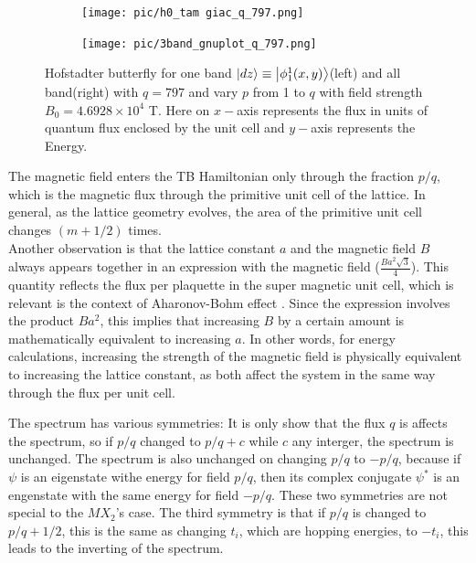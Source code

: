 \documentclass{report}
\begin{document}
\begin{figure}[htb]
	\centering
	\begin{subfigure}[b]{0.495\textwidth}
		\centering
		\texttt{[image: pic/h0\_tam giac\_q\_797.png]}
		\label{fig:3 band}
	\end{subfigure}
	\begin{subfigure}[b]{0.495\textwidth}
		\centering
		\texttt{[image: pic/3band\_gnuplot\_q\_797.png]}
		\label{fig:1 band}
	\end{subfigure}
	\caption{
		Hofstadter butterfly for one band $\ket{dz} \equiv \ket{\phi_{1}^{1}(x,y)}$(left) and all band(right) with $q = 797$ and vary $p$  from 1 to $q$ with field strength $B_{0} = 4.6928 \times 10^{4}$ T. Here on $x-$axis represents the flux in units of quantum flux enclosed by the unit cell and $y-$axis represents the Energy.
	}
\end{figure}

The magnetic field enters the TB Hamiltonian only through the fraction $p/q$, which is the magnetic flux through the primitive unit cell of the lattice. In general, as the lattice geometry evolves, the area of the primitive unit cell changes $(m + 1/2)$ times. \\
Another observation is that the lattice constant $a$ and the magnetic field $B$ always appears together in an expression with the magnetic field ($\tfrac{Ba^{2}\sqrt{3}}{4}$). This quantity reflects the flux per plaquette in the super magnetic unit cell, which is relevant is the context of Aharonov-Bohm effect \cite{aharonov1959}. Since the expression involves the product $Ba^{2}$, this implies that increasing $B$ by a certain amount is mathematically equivalent to increasing $a$. In other words, for energy calculations, increasing the strength of the magnetic field is physically equivalent to increasing the lattice constant, as both affect the system in the same way through the flux per unit cell.

The spectrum has various symmetries: It is only show that the flux $q$ is affects the spectrum, so if $p/q$ changed to $p/q + c$ while $c$ any interger, the spectrum is unchanged. The spectrum is also unchanged on changing $p/q$ to $-p/q$, because if $\psi$ is an eigenstate withe energy for field $p/q$, then its complex conjugate $\psi^{*}$ is an engenstate with the same energy for field $-p/q$. These two symmetries are not special to the $MX_{2}$'s case. The third symmetry is that if $p/q$ is changed to $p/q + 1/2$, this is the same as changing $t_{i}$, which are hopping energies, to $-t_{i}$, this leads to the inverting of the spectrum.
\end{document}
